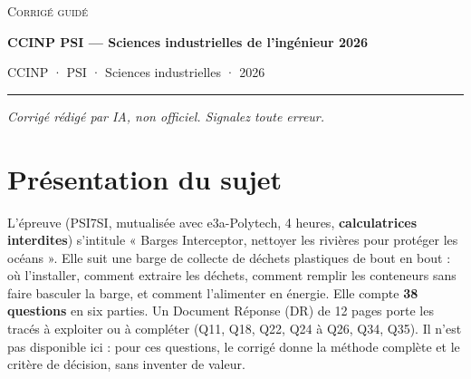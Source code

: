 \documentclass[11pt,a4paper]{article}
\begin{document}
\thispagestyle{plain}
\begin{center}
  {\small\scshape Corrigé guidé}\par\smallskip
  {\LARGE\bfseries CCINP PSI — Sciences industrielles de l'ingénieur 2026\par}\medskip
  {\large CCINP · PSI · Sciences industrielles · 2026\par}
\end{center}
\vspace{2pt}\hrule\vspace{8pt}

\emph{Corrigé rédigé par IA, non officiel. Signalez toute erreur.}

\hypertarget{pruxe9sentation-du-sujet}{%
\section{Présentation du sujet}\label{pruxe9sentation-du-sujet}}

L'épreuve (PSI7SI, mutualisée avec e3a-Polytech, 4 heures, \textbf{calculatrices interdites}) s'intitule « Barges Interceptor, nettoyer les rivières pour protéger les océans ». Elle suit une barge de collecte de déchets plastiques de bout en bout : où l'installer, comment extraire les déchets, comment remplir les conteneurs sans faire basculer la barge, et comment l'alimenter en énergie. Elle compte \textbf{38 questions} en six parties. Un Document Réponse (DR) de 12 pages porte les tracés à exploiter ou à compléter (Q11, Q18, Q22, Q24 à Q26, Q34, Q35). Il n'est pas disponible ici : pour ces questions, le corrigé donne la méthode complète et le critère de décision, sans inventer de valeur.
\end{document}
